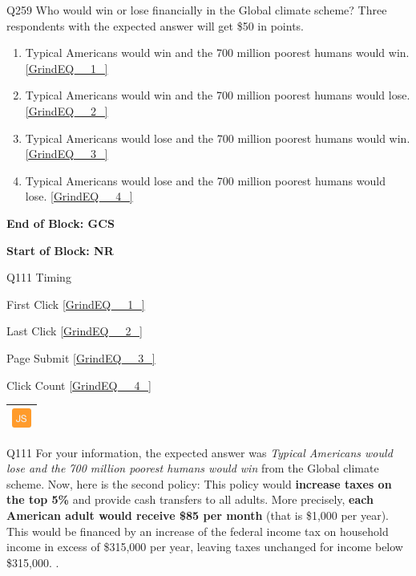 \documentclass{article} %
\begin{document}
\noindent 

\noindent 

\noindent 

\noindent Q259 Who would win or lose financially in the Global climate scheme? Three respondents with the expected answer will get \$50 in points.

\begin{enumerate}
\item  Typical Americans would win and the 700 million poorest humans would win.  \eqref{GrindEQ__1_} 

\item  Typical Americans would win and the 700 million poorest humans would lose.  \eqref{GrindEQ__2_} 

\item  Typical Americans would lose and the 700 million poorest humans would win.  \eqref{GrindEQ__3_} 

\item  Typical Americans would lose and the 700 million poorest humans would lose.  \eqref{GrindEQ__4_} 
\end{enumerate}

\noindent 

\noindent \textbf{End of Block: GCS}

\noindent \textbf{}

\noindent \textbf{Start of Block: NR}

\noindent 

\noindent Q111 Timing

\noindent First Click  \eqref{GrindEQ__1_}

\noindent Last Click  \eqref{GrindEQ__2_}

\noindent Page Submit  \eqref{GrindEQ__3_}

\noindent Click Count  \eqref{GrindEQ__4_}

\noindent 

\noindent 

\begin{tabular}{|p{0.2in}|} \hline 
\includegraphics*[width=0.25in, height=0.25in]{image5} \\ \hline 
\end{tabular}



\noindent Q111 For your information, the expected answer was \textit{Typical Americans would lose and the 700 million poorest humans would win} from the Global climate scheme. Now, here is the second policy:  \textbf{} This policy would \textbf{increase taxes on the top 5\%} and provide cash transfers to all adults. More precisely, \textbf{each American adult would receive \$85 per month} (that is \$1,000 per year). This would be financed by an increase of the federal income tax on household income in excess of \$315,000 per year, leaving taxes unchanged for income below \$315,000. .
\end{document}
